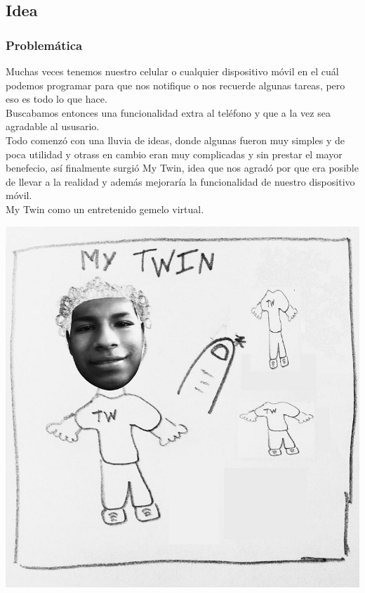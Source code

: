 \documentclass[12pt]{article}
\begin{document}
{{{\begin{flushleft}
\subsection{Idea}
\subsubsection{Problem\'atica}
Muchas veces tenemos nuestro celular o cualquier dispositivo m\'ovil en el cuál podemos programar para que nos notifique o nos recuerde algunas tareas, pero eso es todo lo que hace.\\
Buscabamos entonces una funcionalidad extra al tel\'efono y que a la vez sea agradable al ususario.\\
Todo comenz\'o con una lluvia de ideas, donde algunas fueron muy simples y de poca utilidad y otrass en cambio eran muy complicadas y sin prestar el mayor benefecio, as\'i finalmente surgi\'o My Twin, idea que nos agrad\'o por que era posible de llevar a la realidad y adem\'as mejorar\'ia la funcionalidad de nuestro dispositivo m\'ovil.\\
My Twin como un entretenido gemelo virtual.\\
\begin{center}
\includegraphics[scale=0.3]{imagenes_android/bosquejoI1}
\end{center}


\end{flushleft}}}}
\end{document}
